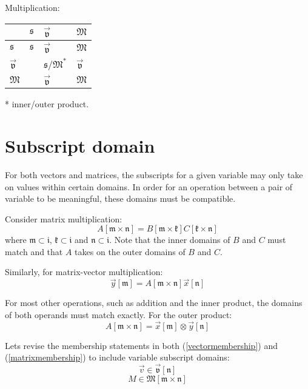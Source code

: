 \documentclass{article}
\newcommand{\subclass}{\mathfrak{i}}
\newcommand{\scalarclass}{\mathfrak{s}}
\newcommand{\vectorclass}{\vec{\mathfrak{v}}}
\newcommand{\matrixclass}{\mathfrak{M}}
\renewcommand{\outer}{\otimes}
\newcommand{\domain}[1]{\mathfrak{#1}}
\begin{document}
Multiplication:

\begin{tabular}{|l|lll|}\hline
	& $\scalarclass$ & $\vectorclass$ & $\matrixclass$ \\ \hline
	$\scalarclass$ & $\scalarclass$ & $\vectorclass$ & $\matrixclass$ \\
	$\vectorclass$ & & $\scalarclass$/$\matrixclass^*$ & $\vectorclass$ \\
	$\matrixclass$ & & $\vectorclass$ & $\matrixclass$ \\\hline
\end{tabular}

* inner/outer product.

\section{Subscript domain}

For both vectors and matrices, the subscripts for a given variable may only
take on values within certain domains.
In order for an operation between a pair of variable to be meaningful,
these domains must be compatible.

Consider matrix multiplication:
\begin{equation}
	A [\domain{m} \times \domain{n}] = B[\domain{m} \times \domain{k}] C [\domain{k} \times \domain{n}]
\end{equation}
where $\domain{m} \subset \subclass$, 
$\domain{k} \subset \subclass$
and $\domain{n} \subset \subclass$.
Note that the inner domains of $B$ and $C$ must match and that $A$ takes on
the outer domains of $B$ and $C$.

Similarly, for matrix-vector multiplication:
\begin{equation}
	\vec y [\domain{m}] = A [\domain{m} \times \domain{n}] \vec x [\domain{n}]
\end{equation}

For most other operations, such as addition and the inner product, the
domains of both operands must match exactly.
For the outer product:
\begin{equation}
	A [\domain{m} \times \domain{n}] = \vec x [\domain{m}] \outer \vec y [\domain{n}]
\end{equation}

Lets revise the membership statements in both (\ref{vectormembership}) and
(\ref{matrixmembership}) to include variable subscript domains:
\begin{equation}
	\vec v \in \vectorclass [\domain{n}]
\end{equation}
\begin{equation}
	M \in \matrixclass [\domain{m} \times \domain{n}]
\end{equation}
\end{document}
